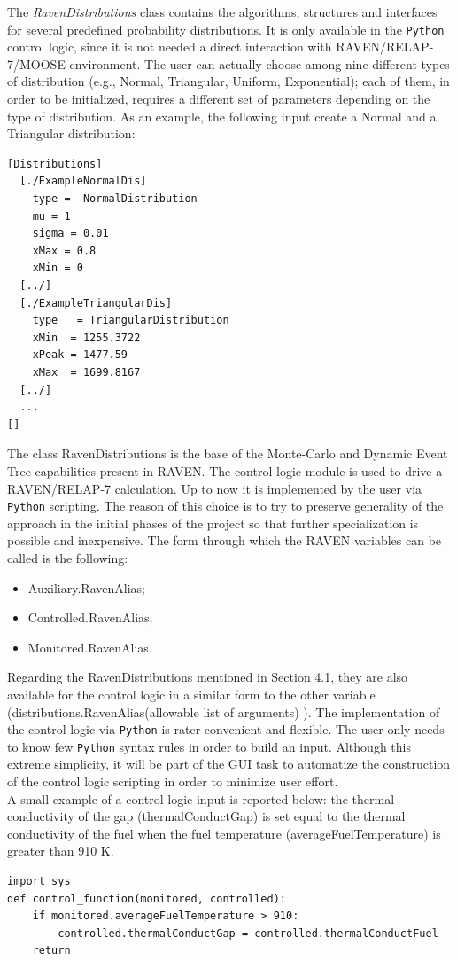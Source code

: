 \documentclass{mc2013}
\begin{document}
The \emph{RavenDistributions} class contains the algorithms, structures and interfaces for several predefined probability distributions. It is only available in the \verb!Python! control logic, since it is not needed a direct interaction with RAVEN/RELAP-7/MOOSE environment. The user can actually choose among nine different types of distribution (e.g., Normal, Triangular, Uniform, Exponential); each of them, in order to be initialized, requires a different set of parameters depending on the type of distribution.
As an example, the following input create a Normal and a Triangular distribution:
\begin{lstlisting}
[Distributions]
  [./ExampleNormalDis]
    type =  NormalDistribution
    mu = 1
    sigma = 0.01
    xMax = 0.8
    xMin = 0
  [../]
  [./ExampleTriangularDis]
    type   = TriangularDistribution
    xMin  = 1255.3722 
    xPeak = 1477.59
    xMax  = 1699.8167 
  [../]
  ...
[]
\end{lstlisting}
The class RavenDistributions is the base of the Monte-Carlo and Dynamic Event Tree capabilities present in RAVEN. 
\label{sec:pythonControlLogic} 
The control logic module is used to drive a RAVEN/RELAP-7 calculation. Up to now it is implemented by the user via \verb!Python! scripting. The reason of this choice is to try to preserve generality of the approach in the initial phases of the project so that further specialization is possible and  inexpensive.  
The form through which the RAVEN variables can be called is the following:
\begin{itemize}
  \item Auxiliary.RavenAlias;
  \item Controlled.RavenAlias;
  \item Monitored.RavenAlias.
\end{itemize}
Regarding the RavenDistributions mentioned in Section 4.1, they are also available for the control logic in a similar form to the other variable (distributions.RavenAlias(allowable list of arguments) ).
The implementation of the control logic via \verb!Python! is rater convenient and flexible. The user only needs to know few \verb!Python! syntax rules in order to build an input. Although this extreme simplicity, it will be part of the GUI task to automatize the construction of the control logic scripting in order to minimize user effort. 
\\A small example of a control logic input is reported below: the thermal conductivity of the gap (thermalConductGap) is set equal to the thermal conductivity of the fuel when the fuel temperature (averageFuelTemperature) is greater than 910 K. 
\lstset{
   language=Python,
   showstringspaces=false,
   formfeed=\newpage,
   tabsize=2,
   commentstyle=\itshape
}
\begin{lstlisting}
import sys
def control_function(monitored, controlled):
    if monitored.averageFuelTemperature > 910:
        controlled.thermalConductGap = controlled.thermalConductFuel
    return 
\end{lstlisting}
\end{document}
